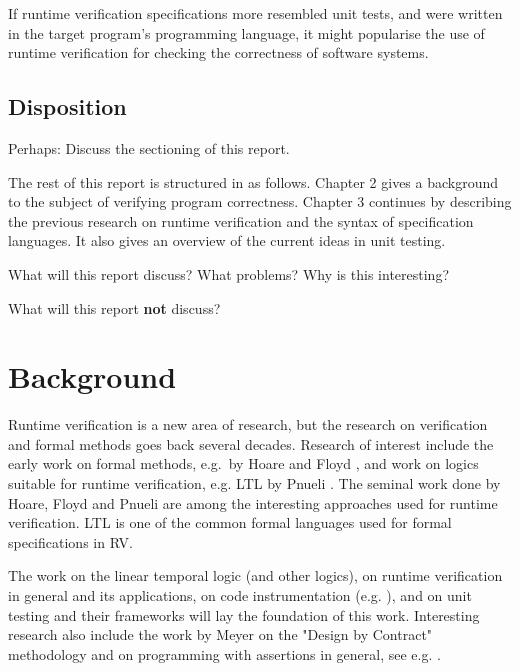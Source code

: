 \documentclass[a4paper,11pt]{kth-mag}
\begin{document}
If runtime verification specifications more resembled unit tests, and were
written in the target program's programming language, it might popularise the
use of runtime verification for checking the correctness of software systems.

\section{Disposition}

Perhaps: Discuss the sectioning of this report.

The rest of this report is structured in as follows. Chapter 2 gives a
background to the subject of verifying program correctness. Chapter 3 continues
by describing the previous research on runtime verification and the syntax of
specification languages. It also gives an overview of the current ideas in unit
testing.

What will this report discuss? What problems? Why is this interesting?

What will this report \textbf{not} discuss?





\pagestyle{newchap}
\chapter{Background} \label{chapter-background}

Runtime verification is a new area of research, but the research on
verification and formal methods goes back several decades. Research of interest
include the early work on formal methods, e.g.\ by Hoare \cite{hoare69} and
Floyd \cite{floyd67}, and work on logics suitable for runtime verification,
e.g. LTL by Pnueli \cite{pnueli77}. The seminal work done by Hoare, Floyd and
Pnueli are among the interesting approaches used for runtime verification. LTL
is one of the common formal languages used for formal specifications in RV.

The work on the linear temporal logic (and other logics), on runtime
verification in general and its applications, on code instrumentation (e.g.
\cite{aspectj,matusiak09aoppy}), and on unit testing and their frameworks will
lay the foundation of this work. Interesting research also include the work by
Meyer on the "Design by Contract" methodology \cite{meyer92applyingdbc} and on
programming with assertions in general, see e.g.
\cite{rosenblum95practicalassertions,bartetzko01jass}.
\end{document}
